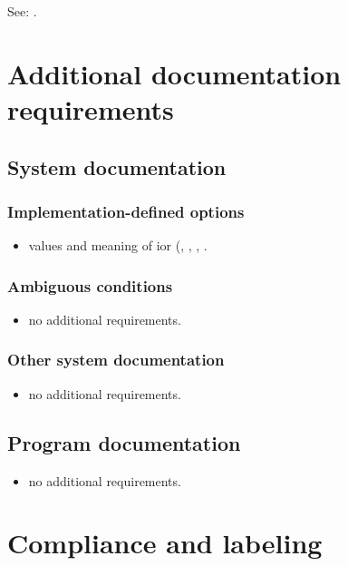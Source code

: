 See: .


\section{Additional documentation requirements} %

\subsection{System documentation} %

\subsubsection{Implementation-defined options} %
\begin{itemize}
\item values and meaning of ior
	(,
	 ,
	 ,
	 .
\end{itemize}

\subsubsection{Ambiguous conditions} %
\begin{itemize}
\item no additional requirements.
\end{itemize}

\subsubsection{Other system documentation} %
\begin{itemize}
\item no additional requirements.
\end{itemize}

\subsection{Program documentation} %
\begin{itemize}
\item no additional requirements.
\end{itemize}

\section{Compliance and labeling} %

